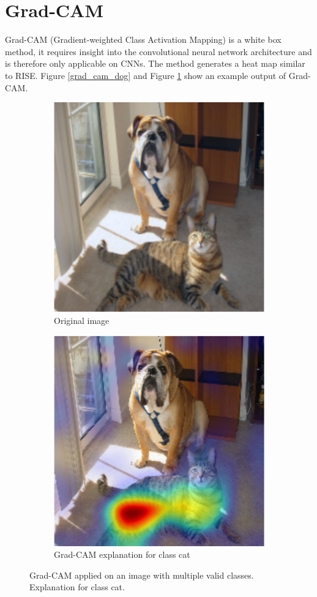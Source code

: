 \section{Grad-CAM}
Grad-CAM\cite{selvaraju2017grad} (Gradient-weighted Class Activation Mapping) is a white box method, it requires insight into the convolutional neural network architecture and is therefore only applicable on CNNs. The method generates a heat map similar to RISE. Figure \ref{grad_cam_dog} and Figure \ref{grad_cam_cat} show an example output of Grad-CAM.

\begin{figure}[H]
    \centering
    \begin{subfigure}{.5\textwidth}
        \centering
        \includegraphics[width=0.7\linewidth]{chapters/02_methods/images/grad-cam-original.png}
        \caption{Original image}
    \end{subfigure}\hfill%
    \begin{subfigure}{.5\textwidth}
        \centering
        \includegraphics[width=0.7\linewidth]{chapters/02_methods/images/grad-cam-cat.png}
        \caption{Grad-CAM explanation for class cat}
    \end{subfigure}
    \caption{Grad-CAM applied on an image with multiple valid classes. Explanation for class cat.}
    \label{grad_cam_cat}
\end{figure}

